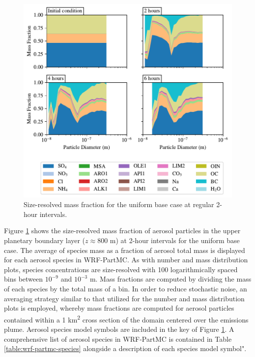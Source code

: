 \begin{figure}[!t]
  \centering
    \includegraphics[width=\textwidth]{figures/chapter5/speciated-mass-frac-four-panel-uniform-basecase-z40.pdf}
    \caption{Size-resolved mass fraction for the uniform base case at regular 2-hour intervals.}
    \label{fig:mass-frac-ub}
\end{figure}

Figure \ref{fig:mass-frac-ub} shows the size-resolved mass fraction of aerosol particles in the upper planetary boundary layer ($z\approx800$ m) at 2-hour intervals for the uniform base case. The average of species mass as a fraction of aerosol total mass is displayed for each aerosol species in WRF-PartMC. As with number and mass distribution plots, species concentrations are size-resolved with 100 logarithmically spaced bins between $10^{-9}$ and $10^{-3}$ m. Mass fractions are computed by dividing the mass of each species by the total mass of a bin. In order to reduce stochastic noise, an averaging strategy similar to that utilized for the number and mass distribution plots is employed, whereby mass fractions are computed for aerosol particles contained within a 1 \si{km^2} cross section of the domain centered over the emissions plume. Aerosol species model symbols are included in the key of Figure \ref{fig:mass-frac-ub}. A comprehensive list of aerosol species in WRF-PartMC is contained in Table \ref{table:wrf-partmc-species} alongside a description of each species model symbol". 

